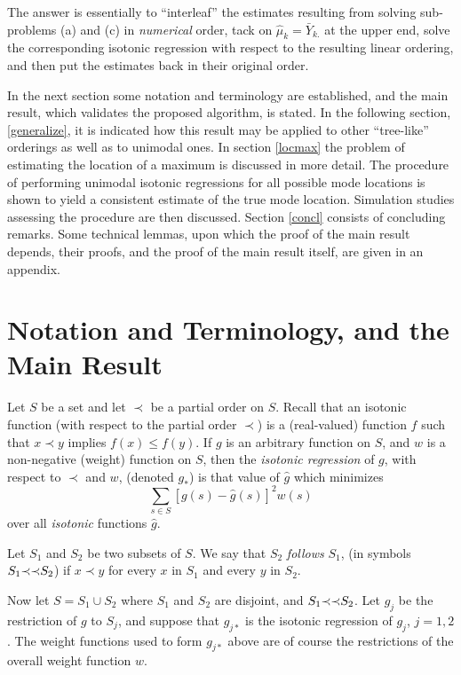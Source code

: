 The answer is essentially to ``interleaf'' the estimates
resulting from solving sub-problems (a) and (c) in {\em
numerical} order, tack on $\hat{\mu}_k = \bar{Y}_{k.}$ at the upper
end, solve the corresponding isotonic regression with
respect to the resulting linear ordering, and then put the
estimates back in their original order.

In the next section some notation and terminology are established,
and the main result, which validates the proposed algorithm, is stated.
In the following section, \ref{generalize}, it is indicated how this
result may be applied to other ``tree-like'' orderings as well as to
unimodal ones.  In section \ref{locmax} the problem of estimating the
location of a maximum is discussed in more detail.  The procedure of
performing unimodal isotonic regressions for all possible mode
locations is shown to yield a consistent estimate of the true mode
location.  Simulation studies assessing the procedure are then
discussed.  Section \ref{concl} consists of concluding remarks.
Some technical lemmas, upon which the proof of the main result depends,
their proofs, and the proof of the main result itself, are
given in an appendix.

\section{Notation and Terminology, and the Main Result}
\label{mainres}
Let $S$ be a set and let $\prec$ be a partial order on
$S$.  Recall that an isotonic function (with respect to the
partial order $\prec$) is a (real-valued) function $f$ such
that $x \prec y$ implies $f(x) \leq f(y)$.  If $g$ is an
arbitrary function on $S$, and $w$ is a non-negative
(weight) function on $S$, then the {\em isotonic
regression} of $g$, with respect to $\prec$ and $w$,
(denoted $g_*$) is that value of $\hat{g}$ which minimizes
\begin{displaymath} \sum_{s \in S} [g(s) -
\hat{g}(s)]^2w(s) \end{displaymath} over all {\em isotonic}
functions $\hat{g}$.

Let $S_1$ and $S_2$ be two subsets of $S$.  We say that $S_2$ {\em
follows} $S_1$, (in symbols $S_1 \mbox{$\prec \prec$} S_2$) if $x \prec y$ for every
$x$ in $S_1$ and every $y$ in $S_2$.

Now let $S = S_1 \cup S_2$ where $S_1$ and $S_2$ are
disjoint, and $S_1 \mbox{$\prec \prec$} S_2$.  Let $g_j$ be the restriction
of $g$ to $S_j$, and suppose that $g_{j*}$ is the isotonic
regression of $g_j$, $j = 1,2$.  The weight functions used
to form $g_{j*}$ above are of course the restrictions of
the overall weight function $w$.

